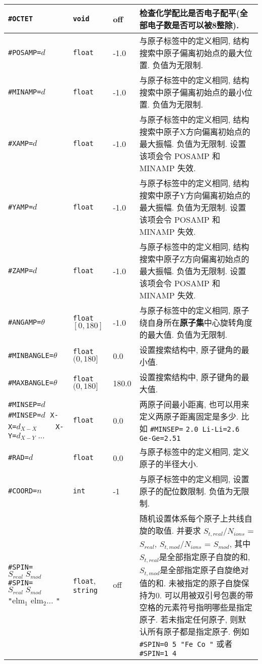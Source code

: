 \documentclass[a4paper, 10pt]{article}
\begin{document}
\begin{center}
\begin{longtable}{m{11em}|m{4em}<{\centering}|m{3em}<{\centering}|m{15em}}
\midrule
 \verb|#OCTET|& \verb|void| & off & 检查化学配比是否电子配平(全部电子数是否可以被8整除).\\
\midrule
 \verb|#POSAMP=|\(d\) & \verb|float|  & -1.0 & 与原子标签中的定义相同, 结构搜索中原子偏离初始点的最大位置. 负值为无限制.\\
\midrule
 \verb|#MINAMP=|\(d\) & \verb|float| & -1.0 & 与原子标签中的定义相同, 结构搜索中原子偏离初始点的最小位置. 负值为无限制.\\
\midrule
 \verb|#XAMP=|\(d\) & \verb|float| & -1.0 & 与原子标签中的定义相同, 结构搜索中原子X方向偏离初始点的最大振幅. 负值为无限制. 设置该项会令 POSAMP 和 MINAMP 失效. \\
\midrule
 \verb|#YAMP=|\(d\) & \verb|float| & -1.0 & 与原子标签中的定义相同, 结构搜索中原子Y方向偏离初始点的最大振幅. 负值为无限制. 设置该项会令 POSAMP 和 MINAMP 失效.\\
\midrule
 \verb|#ZAMP=|\(d\) & \verb|float| & -1.0 & 与原子标签中的定义相同, 结构搜索中原子Z方向偏离初始点的最大振幅. 负值为无限制. 设置该项会令 POSAMP 和 MINAMP 失效.\\
\midrule
 \verb|#ANGAMP=|\(\theta\)& \verb|float| \([0,180]\) & -1.0 & 与原子标签中的定义相同, 原子绕自身所在\textbf{原子集}中心旋转角度的最大值. 负值为无限制.\\
\midrule
 \verb|#MINBANGLE=|\(\theta\) & \verb|float| \((0,180]\) & 0.0 & 设置搜索结构中, 原子键角的最小值.\\
\midrule
 \verb|#MAXBANGLE=|\(\theta\) & \verb|float| \((0,180]\) & 180.0 &设置搜索结构中, 原子键角的最大值.\\
\midrule
 \verb|#MINSEP=|\(d\) \verb|#MINSEP=|\(d\;\) \verb|X-X=|\(d_{X-X}\;\)\ \ \  \ \verb|X-Y=|\(d_{X-Y}\;...\) & \verb|float| & 0.0 & 两原子间最小距离, 也可以用来定义两原子距离固定是多少. 比如 \verb|#MINSEP=| \verb|2.0 Li-Li=2.6 Ge-Ge=2.51|\\
\midrule
 \verb|#RAD=|\(d\)& \verb|float|  & 0.0 & 与原子标签中的定义相同, 定义原子的半径大小.\\
\midrule
 \verb|#COORD=|\(n\)& \verb|int| & -1 & 与原子标签中的定义相同, 设置原子的配位数限制. 负值为无限制.\\
\midrule
 \verb|#SPIN=|\(S_{real}\;S_{mod}\;\;\;\;\;\;\) \verb|#SPIN=|\(S_{real}\;S_{mod}\;\;\;\;\;\) \verb|"|elm\(_1\) elm\(_2\)... \verb|"| & \verb|float|, \verb|string|& off & 随机设置体系每个原子上共线自旋的取值. 并要求 \(S_{t,real}\)/\(N_{ions}\) = \(S_{real}\), \(S_{t,mod}\)/\(N_{ions}\) = \(S_{mod}\), 其中\(S_{t,real}\)是全部指定原子自旋的和, \(S_{t,mod}\)是全部指定原子自旋绝对值的和. 未被指定的原子自旋保持为0. 可以用被双引号包裹的带空格的元素符号指明哪些是指定原子. 若未指定任何原子, 则默认所有原子都是指定原子. 例如 \verb|#SPIN=0 5 "Fe Co "| 或者 \verb|#SPIN=1 4| \\

\end{longtable}
\end{center}
\end{document}
